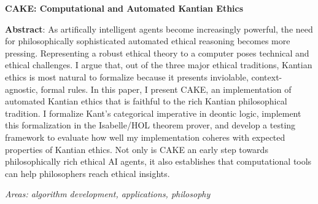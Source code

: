 \documentclass[11pt]{article}
\begin{document}
\noindent \textbf{CAKE: Computational and Automated Kantian Ethics}

\medskip 

\noindent \textbf{Abstract}: As artifically intelligent agents become increasingly powerful, the need for philosophically
sophisticated automated ethical reasoning becomes more pressing. Representing a robust ethical theory 
to a computer poses technical and ethical challenges. I argue that, out of the three major ethical traditions, Kantian ethics is
most natural to formalize because it presents inviolable, context-agnostic, formal rules. In this paper, 
I present CAKE, an implementation of automated Kantian ethics that is faithful to the rich Kantian 
philosophical tradition. I formalize Kant's categorical imperative in deontic logic, implement this 
formalization in the Isabelle/HOL theorem prover, and develop a testing framework to evaluate how well 
my implementation coheres with expected properties of Kantian ethics. Not only is CAKE an early step 
towards philosophically rich ethical AI agents, it also establishes that computational tools can help 
philosophers reach ethical insights.

\smallskip
\noindent \emph{Areas: algorithm development, applications, philosophy}
\end{document}
